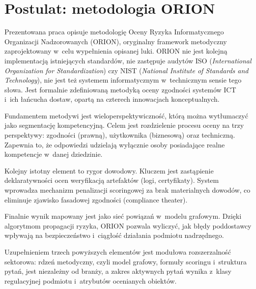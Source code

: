 \section{Postulat: metodologia ORION}
Prezentowana praca opisuje metodologię Oceny Ryzyka Informatycznego Organizacji Nadzorowanych (ORION), oryginalny framework metodyczny zaprojektowany w~celu wypełnienia opisanej luki. ORION nie jest kolejną implementacją istniejących standardów, nie zastępuje audytów ISO (\textit{International Organization for Standardization}) czy NIST (\textit{National Institute of Standards and Technology}), nie jest też systemem informatycznym w~technicznym sensie tego słowa. Jest formalnie zdefiniowaną metodyką oceny zgodności systemów ICT i~ich łańcucha dostaw, opartą na czterech innowacjach konceptualnych.

Fundamentem metodywi jest wieloperspektywiczność, którą można wytłumaczyć jako segmentację kompetencyjną. Celem jest rozdzielenie procesu oceny na trzy perspektywy: zgodności (prawną), użytkownika (biznesową) oraz techniczną. Zapewnia to, że odpowiedzi udzielają wyłącznie osoby posiadające realne kompetencje w~danej dziedzinie.

Kolejny istotny element to rygor dowodowy. Kluczem jest zastąpienie deklaratywności ocen weryfikacją artefaktów (logi, certyfikaty). System wprowadza mechanizm penalizacji scoringowej za brak materialnych dowodów, co eliminuje zjawisko fasadowej zgodności (compliance theater).

Finalnie wynik mapowany jest jako sieć powiązań w~modelu grafowym. Dzięki algorytmom propagacji ryzyka, ORION pozwala wyliczyć, jak błędy poddostawcy wpływają na bezpieczeństwo i~ciągłość działania podmiotu nadrzędnego.

Uzupełnieniem trzech powyższych elementów jest modułowa rozszerzalność sektorowa: rdzeń metodyczny, czyli model grafowy, formuły scoringu i~struktura pytań, jest niezależny od branży, a zakres aktywnych pytań wynika z~klasy regulacyjnej podmiotu i~atrybutów ocenianych obiektów.

